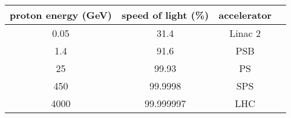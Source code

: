 \begin{tabular}{c|c|c|c}
  proton energy (GeV) & speed of light (\%) & accelerator \\
  \hline
     0.05             & 31.4                & Linac 2     \\
     1.4              & 91.6                & PSB         \\
    25                & 99.93               & PS          \\
   450                & 99.9998             & SPS         \\
  4000                & 99.999997           & LHC         \\
\end{tabular}


